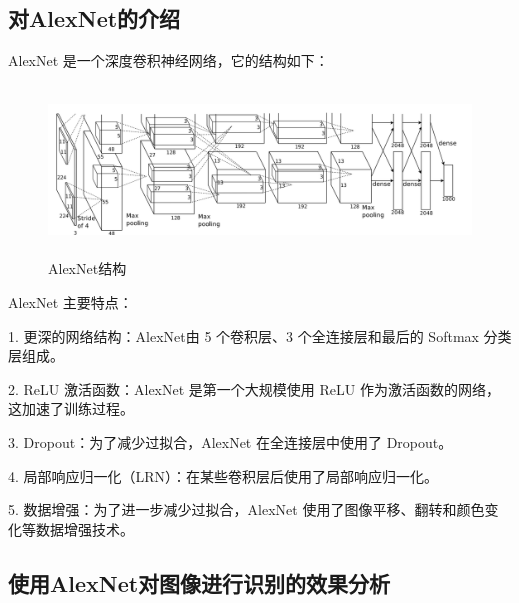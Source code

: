 \subsection{对AlexNet的介绍}
AlexNet 是一个深度卷积神经网络，它的结构如下：\cite{AlexNet}

\begin{figure}[H]
    \centering %
    \includegraphics[height=4.5cm]{../../AlexNet/AlexNet_arc.png}
    \caption{AlexNet结构}
\end{figure}

AlexNet 主要特点：\par
1. 更深的网络结构：AlexNet由 5 个卷积层、3 个全连接层和最后的 Softmax 分类层组成。 \par
2. ReLU 激活函数：AlexNet 是第一个大规模使用 ReLU 作为激活函数的网络，这加速了训练过程。 \par
3. Dropout：为了减少过拟合，AlexNet 在全连接层中使用了 Dropout。 \par
4. 局部响应归一化（LRN）：在某些卷积层后使用了局部响应归一化。 \par
5. 数据增强：为了进一步减少过拟合，AlexNet 使用了图像平移、翻转和颜色变化等数据增强技术。 \par

\subsection{使用AlexNet对图像进行识别的效果分析}

